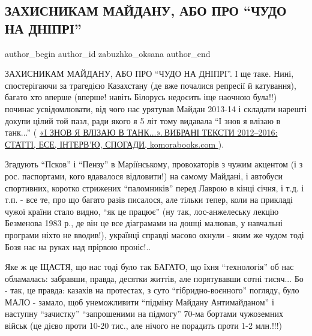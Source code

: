  
 
 
 
 
 
\subsection{ЗАХИСНИКАМ МАЙДАНУ, АБО ПРО \enquote{ЧУДО НА ДНІПРІ}}
\label{sec:10_01_2022.fb.zabuzhko_oksana.1.chudo_na_dnipri}
 
\ifcmt
 author_begin
   author_id zabuzhko_oksana
 author_end
\fi

ЗАХИСНИКАМ МАЙДАНУ, АБО ПРО \enquote{ЧУДО НА ДНІПРІ}. І ще таке. Нині, спостерігаючи за
трагедією Казахстану (де вже почалися репресії й катування), багато хто вперше
(вперше! навіть Білорусь недосить іще наочною була!!) починає усвідомлювати,
від чого нас урятував Майдан 2013-14 і складати нарешті докупи цілий той пазл,
ради якого я 5 літ тому видавала \enquote{І знов я влізаю в танк...}
( \href{https://komorabooks.com/product/i-znov-ya-vlizayu-v-tank-vybrani-teksty-2012-2016-statti-ese-interv-yu-spogady}{
«І ЗНОВ Я ВЛІЗАЮ В ТАНК...». ВИБРАНІ ТЕКСТИ 2012–2016: СТАТТІ, ЕСЕ, ІНТЕРВ’Ю, СПОГАДИ, komorabooks.com%
}). 

Згадують \enquote{Псков} і
\enquote{Пензу} в Маріїнському, провокаторів з чужим акцентом (і з рос. паспортами,
кого вдавалося відловити!) на самому Майдані, і автобуси спортивних, коротко
стрижених \enquote{паломників} перед Лаврою в кінці січня, і т.д. і т.п. - все те, про
що багато разів писалося, але тільки тепер, коли на прикладі чужої країни стало
видно, \enquote{як це працює} (ну так, лос-анжелеську лекцію Безменова 1983 р., де він
це все діаграмами на дошці малював, у навчальні програми ніхто не вводив!),
українці справді масово охнули - яким же чудом тоді Бозя нас на руках над
прірвою проніс!..

Яке ж це ЩАСТЯ, що нас тоді було так БАГАТО, що їхня \enquote{технологія} об нас
обламалась: забравши, правда, десятки життів, але порятувавши сотні тисяч... Бо
- так, це правда: казахів на протестах, з суто \enquote{гібридно-воєнного} погляду,
було МАЛО - замало, щоб унеможливити \enquote{підміну Майдану Антимайданом} і наступну
\enquote{зачистку} \enquote{запрошеними на підмогу} 70-ма бортами чужоземних військ (це дієво
проти 10-20 тис., але нічого не порадить проти 1-2 млн.!!!) 

